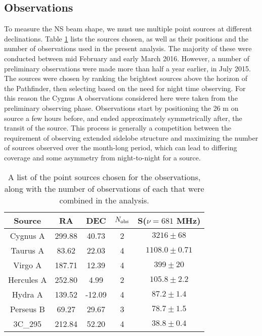 \subsection{Observations} \label{ch:hol:sec:io:ss:o}

To measure the NS beam shape, we must use multiple point sources at different declinations. Table \ref{tab1} lists the sources chosen, as well as their positions and the number of observations used in the present analysis. The majority of these were conducted between mid February and early March 2016. However, a number of preliminary observations were made more than half a year earlier, in July 2015. The sources were chosen by ranking the brightest sources above the horizon of the Pathfinder, then selecting based on the need for night time observing. For this reason the Cygnus A observations considered here were taken from the preliminary observing phase. Observations start by positioning the 26 m on source a few hours before, and ended approximately symmetrically after, the transit of the source. This process is generally a competition between the requirement of observing extended sidelobe structure and maximizing the number of sources observed over the month-long period, which can lead to differing coverage and some asymmetry from night-to-night for a source.

\begin{table}[ht]
\caption{A list of the point sources chosen for the observations, along with the number of observations of each that were combined in the analysis.} 
\label{tab1}
\begin{center}
\begin{tabular}{| c  | c | c | c | c |  }
\hline
 Source  & RA    &        DEC    &  $N_{\rm obs}$ & S($\nu=681$ MHz) \\ \hline
Cygnus A & 299.88  & 40.73  & 2 & $3216 \pm 68$ \\ \hline
Taurus A & 83.62  & 22.03   & 4  & $1108.0 \pm 0.71$ \\ \hline
Virgo A & 187.71 & 12.39  & 4 & $399 \pm 20$\\ \hline
Hercules A & 252.80   & 4.99  & 2   & $105.8 \pm 2.2$  \\ \hline
Hydra A & 139.52  & -12.09  & 4 & $87.2 \pm 1.4$ \\ \hline
Perseus B  & 69.27  & 29.67  &  3  & $78.7 \pm 1.5$ \\ \hline
3C\_295 & 212.84  & 52.20 & 4   & $38.8 \pm 0.4$\\ \hline
\end{tabular}
\end{center}
\end{table}

